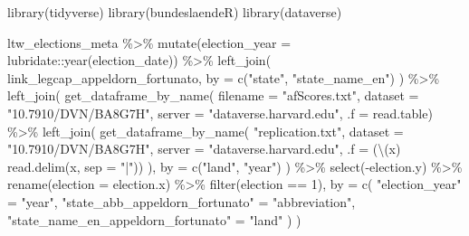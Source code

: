 \documentclass[
]{scrartcl}
\newenvironment{Shaded}{\begin{snugshade}}{\end{snugshade}}
\newcommand{\AttributeTok}[1]{\textcolor[rgb]{0.77,0.63,0.00}{#1}}
\newcommand{\DecValTok}[1]{\textcolor[rgb]{0.00,0.00,0.81}{#1}}
\newcommand{\FunctionTok}[1]{\textcolor[rgb]{0.00,0.00,0.00}{#1}}
\newcommand{\NormalTok}[1]{#1}
\newcommand{\OtherTok}[1]{\textcolor[rgb]{0.56,0.35,0.01}{#1}}
\newcommand{\SpecialCharTok}[1]{\textcolor[rgb]{0.00,0.00,0.00}{#1}}
\newcommand{\StringTok}[1]{\textcolor[rgb]{0.31,0.60,0.02}{#1}}
\begin{document}
\begin{Shaded}
\begin{Highlighting}[]
\FunctionTok{library}\NormalTok{(tidyverse)}
\FunctionTok{library}\NormalTok{(bundeslaendeR)}
\FunctionTok{library}\NormalTok{(dataverse)}

\NormalTok{ltw\_elections\_meta }\SpecialCharTok{\%\textgreater{}\%} 
  \FunctionTok{mutate}\NormalTok{(}\AttributeTok{election\_year =}\NormalTok{ lubridate}\SpecialCharTok{::}\FunctionTok{year}\NormalTok{(election\_date)) }\SpecialCharTok{\%\textgreater{}\%}
  \FunctionTok{left\_join}\NormalTok{(}
\NormalTok{    link\_legcap\_appeldorn\_fortunato,}
    \AttributeTok{by =} \FunctionTok{c}\NormalTok{(}\StringTok{"state"}\NormalTok{, }\StringTok{"state\_name\_en"}\NormalTok{)}
\NormalTok{  ) }\SpecialCharTok{\%\textgreater{}\%}
  \FunctionTok{left\_join}\NormalTok{(}
    \FunctionTok{get\_dataframe\_by\_name}\NormalTok{(}
      \AttributeTok{filename =} \StringTok{"afScores.txt"}\NormalTok{, }
      \AttributeTok{dataset =} \StringTok{"10.7910/DVN/BA8G7H"}\NormalTok{,}
      \AttributeTok{server =} \StringTok{"dataverse.harvard.edu"}\NormalTok{,}
      \AttributeTok{.f =}\NormalTok{ read.table) }\SpecialCharTok{\%\textgreater{}\%} 
      \FunctionTok{left\_join}\NormalTok{(}
        \FunctionTok{get\_dataframe\_by\_name}\NormalTok{(}
          \StringTok{"replication.txt"}\NormalTok{, }
          \AttributeTok{dataset =} \StringTok{"10.7910/DVN/BA8G7H"}\NormalTok{, }
          \AttributeTok{server =} \StringTok{"dataverse.harvard.edu"}\NormalTok{,}
          \AttributeTok{.f =}\NormalTok{ (\textbackslash{}(x) }\FunctionTok{read.delim}\NormalTok{(x, }\AttributeTok{sep =} \StringTok{"|"}\NormalTok{))}
\NormalTok{        ),}
        \AttributeTok{by =} \FunctionTok{c}\NormalTok{(}\StringTok{"land"}\NormalTok{, }\StringTok{"year"}\NormalTok{)}
\NormalTok{      ) }\SpecialCharTok{\%\textgreater{}\%} 
      \FunctionTok{select}\NormalTok{(}\SpecialCharTok{{-}}\NormalTok{election.y) }\SpecialCharTok{\%\textgreater{}\%} 
      \FunctionTok{rename}\NormalTok{(}\AttributeTok{election =}\NormalTok{ election.x) }\SpecialCharTok{\%\textgreater{}\%} 
      \FunctionTok{filter}\NormalTok{(election }\SpecialCharTok{==} \DecValTok{1}\NormalTok{),}
    \AttributeTok{by =} \FunctionTok{c}\NormalTok{(}
      \StringTok{"election\_year"} \OtherTok{=} \StringTok{"year"}\NormalTok{,}
      \StringTok{"state\_abb\_appeldorn\_fortunato"} \OtherTok{=} \StringTok{"abbreviation"}\NormalTok{,}
      \StringTok{"state\_name\_en\_appeldorn\_fortunato"} \OtherTok{=} \StringTok{"land"}
\NormalTok{    )}
\NormalTok{  )}
\end{Highlighting}
\end{Shaded}
\end{document}
